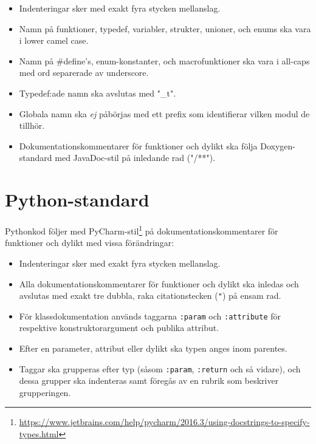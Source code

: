 \documentclass[a4paper,11pt]{article}
\begin{document}
\begin{appendices}
\begin{itemize}
    \item Indenteringar sker med exakt fyra stycken mellanslag.
    \item Namn på funktioner, typedef, variabler, strukter, unioner, och enums ska vara i lower camel case.
    \item Namn på \#define's, enum-konstanter, och macrofunktioner ska vara i all-caps med ord separerade av underscore.
    \item Typedef:ade namn ska avslutas med "\_t".
    \item Globala namn ska \textit{ej} påbörjas med ett prefix som identifierar vilken modul de tillhör.
    \item Dokumentationskommentarer för funktioner och dylikt ska följa Doxygen-standard med JavaDoc-stil på inledande rad ("/**").
\end{itemize}

\clearpage
\section{Python-standard} \label{sec:pythonstandard}
Pythonkod följer \cite{pep8} med PyCharm-stil\footnote{\url{https://www.jetbrains.com/help/pycharm/2016.3/using-docstrings-to-specify-types.html}} på dokumentationskommentarer för funktioner och dylikt med vissa förändringar:

\begin{itemize}
    \item Indenteringar sker med exakt fyra stycken mellanslag.
    \item Alla dokumentationskommentarer för funktioner och dylikt ska inledas och avslutas med exakt tre dubbla, raka citationstecken (\texttt{"}) på ensam rad.
    \item För klassdokumentation används taggarna \texttt{:param} och \texttt{:attribute} för respektive konstruktorargument och publika attribut.
    \item Efter en parameter, attribut eller dylikt ska typen anges inom parentes.
    \item Taggar ska grupperas efter typ (såsom \texttt{:param}, \texttt{:return} och så vidare), och dessa grupper ska indenteras samt föregås av en rubrik som beskriver grupperingen.
\end{itemize}

\clearpage

\end{appendices}
\end{document}
